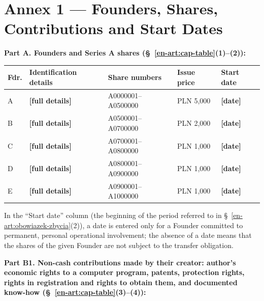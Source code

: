 \documentclass[12pt,a4paper]{report}
\newcommand{\field}[1]{\textbf{[#1]}}
\begin{document}
\newpage

\section*{Annex 1 --- Founders, Shares, Contributions and Start Dates}

\textbf{Part A. Founders and Series A shares (\S~\ref{en-art:cap-table}(1)--(2)):}

\begin{center}
\begin{tabularx}{\linewidth}{@{}p{0.9cm} >{\raggedright\arraybackslash}X p{4.2cm} p{1.9cm} p{2.3cm}@{}}
\toprule
\textbf{Fdr.} & \textbf{Identification details} & \textbf{Share numbers} & \textbf{Issue price} & \textbf{Start date} \\
\midrule
A & \field{full details} & A0000001--A0500000 & PLN 5,000 & \field{date} \\
B & \field{full details} & A0500001--A0700000 & PLN 2,000 & \field{date} \\
C & \field{full details} & A0700001--A0800000 & PLN 1,000 & \field{date} \\
D & \field{full details} & A0800001--A0900000 & PLN 1,000 & \field{date} \\
E & \field{full details} & A0900001--A1000000 & PLN 1,000 & \field{date} \\
\bottomrule
\end{tabularx}
\end{center}

In the ``Start date'' column (the beginning of the period referred to in \S~\ref{en-art:obowiazek-zbycia}(2)), a date is entered only for a Founder committed to permanent, personal operational involvement; the absence of a date means that the shares of the given Founder are not subject to the transfer obligation.

\textbf{Part B1. Non-cash contributions made by their creator: author's economic rights to a computer program, patents, protection rights, rights in registration and rights to obtain them, and documented know-how (\S~\ref{en-art:cap-table}(3)--(4)):}
\end{document}
